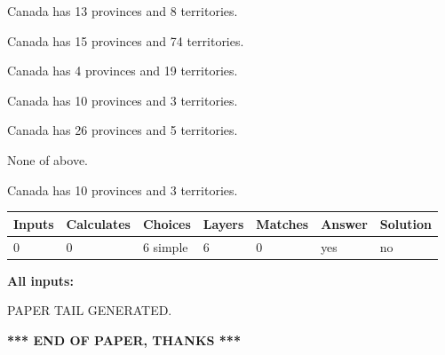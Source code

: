 \documentclass[12pt]{article}
\begin{document}
 
Canada has  13 provinces and  8 territories.
 
 
Canada has  15 provinces and  74 territories.
 
 
Canada has   4 provinces and  19 territories.
 
 
Canada has 10  provinces and 3 territories.
 
 
Canada has  26 provinces and  5 territories.
 
 
 None of above.
 
 
\noindent{}
 
 
Canada has 10  provinces and 3 territories.
 
 
\noindent{}
 
 
   
   
   
   
\noindent\begin{tabular}{|l|l|l|l|l|l|l|}
 \hline
Inputs & Calculates & Choices & Layers & Matches & Answer & Solution \\ \hline
 0  & 
 0  & 
 6
  simple  
  & 
 6  & 
 0  & 
  yes & 
  no 
  \\ \hline
 \end{tabular}
   
   
   
   
\noindent{}
   
   
   
   
\noindent\vspace{0.1in}\hspace{-0.08in} {\textbf{\Large{All inputs: }}}
   
   
   
   
   
   
 \vspace{0.2in}
 
   
   
\vspace{2.0in} PAPER TAIL GENERATED.
   
   
   
   
\vspace{1.0in} 
{\textbf{\large{ *** END OF PAPER, THANKS *** }}} 
   
\end{document}
